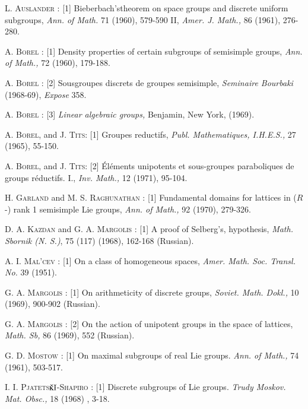 \begin{thebibliography}{99}
 \textsc{L. Auslander : [1]} Bieberbach's\pageoriginale theorem on space groups and discrete uniform subgroups, \textit{Ann. of Math.} 71 (1960), 579-590 II, \textit{Amer. J. Math.,} 86 (1961), 276-280.

 \textsc{A. Borel : [1]} Density properties of certain subgroups of semisimple groups, \textit{Ann. of Math.,} 72 (1960), 179-188.

 \textsc{A. Borel : [2]} Sousgroupes discrets de groupes semisimple, \textit{Seminaire Bourbaki} (1968-69), \textit{Expose} 358.

 \textsc{A. Borel : [3]} \textit{Linear algebraic groups,} Benjamin, New York, (1969).

 \textsc{A. Borel,} and \textsc{J. Tits:} [1] Groupes reductifs, \textit{Publ. Mathematiques, I.H.E.S.,} 27 (1965), 55-150.

 \textsc{A. Borel,} and \textsc{J. Tits:} [2] \'El\'ements unipotents et sous-groupes paraboliques de groups r\'eductifs. I., \textit{Inv. Math.,} 12 (1971), 95-104.

 \textsc{H. Garland} and \textsc{M. S. Raghunathan : [1]} Fundamental domains for lattices in ($R$-) rank 1 semisimple Lie groups, \textit{Ann. of Math.,} 92 (1970), 279-326.

 \textsc{D. A. Kazdan} and \textsc{G. A. Margolis :} [1] A proof of Selberg's, hypothesis, \textit{Math. Sbornik (N. S.)}, 75 (117)  (1968), 162-168 (Russian).

 \textsc{A. I. Mal'cev :} [1] On a class of homogeneous spaces, \textit{Amer. Math. Soc. Transl. No.} 39 (1951).

 \textsc{G. A. Margolis :} [1] On arithmeticity of discrete groups, \textit{Soviet. Math. Dokl., } 10 (1969), 900-902 (Russian).

 \textsc{G. A. Margolis :} [2] On the action of unipotent groups in the space of lattices, \textit{Math. Sb,} 86 (1969), 552 (Russian).

 \textsc{G. D. Mostow : [1]} On maximal subgroups of real Lie groups. \textit{Ann. of Math., } 74 (1961), 503-517.

 \textsc{I. I. Pjatets$\check{\textsc{k}}\check{\textsc{i}}$-Shapiro} : [1] Discrete subgroups of Lie groups. \textit{Trudy Moskov. Mat. Obsc.,} 18 (1968) , 3-18.


\end{thebibliography}
